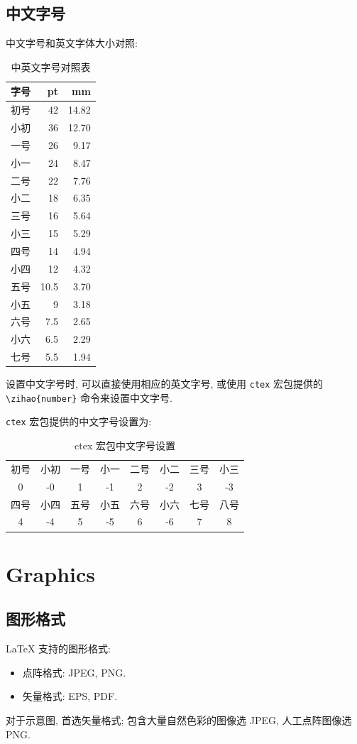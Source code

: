 \documentclass[a4paper,oneside]{book}
\begin{document}
\chapter{中文字号}
中文字号和英文字体大小对照:
\begin{table}[htpb]
  \centering
\begin{tabular}[c]{|lrr|}
字号 &   pt   &   mm\\
\hline
初号 &   42   &   14.82\\
小初 &   36   &   12.70\\
一号 &   26   &   9.17\\
小一 &   24   &   8.47\\
二号 &   22   &   7.76\\
小二 &   18   &   6.35\\
三号 &   16   &   5.64\\
小三 &   15   &   5.29\\
四号 &   14   &   4.94\\
小四 &   12   &   4.32\\
五号 &   10.5 &   3.70\\
小五 &   9    &   3.18\\
六号 &   7.5  &   2.65\\
小六 &   6.5  &   2.29\\
七号 &   5.5  &   1.94
\end{tabular}
\caption{中英文字号对照表}
\end{table}

设置中文字号时, 可以直接使用相应的英文字号, 或使用 \verb|ctex| 宏包提供的 \verb|\zihao{number}| 命令来设置中文字号.

\verb|ctex| 宏包提供的中文字号设置为:
\begin{table}[htpb]
  \centering
\begin{tabular}[c]{*{8}{c}}
  \hline
初号&小初&一号&小一&二号&小二&三号&小三\\
0&-0&1&-1&2&-2&3&-3\\
\hline
四号&小四&五号&小五&六号&小六&七号&八号\\
4&-4&5&-5&6&-6&7&8\\
\hline
\end{tabular}
\caption{\textsf{ctex} 宏包中文字号设置}
\end{table}



\part{Graphics}
\chapter{图形格式}
\LaTeX{} 支持的图形格式:
\begin{itemize}
  \item 点阵格式: JPEG, PNG.
  \item 矢量格式: EPS, PDF.
\end{itemize}
 对于示意图, 首选矢量格式; 包含大量自然色彩的图像选 JPEG, 人工点阵图像选 PNG.
\end{document}
